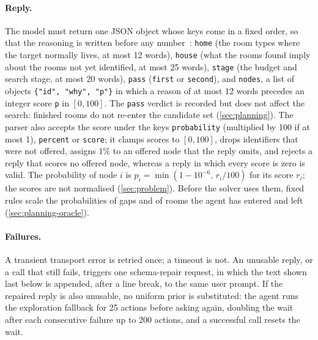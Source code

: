 \documentclass[10pt]{article}
\begin{document}
\paragraph{Reply.} The model must return one JSON object whose keys come in a fixed order, so that the reasoning is written before any number~\citep{wei2022chain}: \texttt{home} (the room types where the target normally lives, at most 12 words), \texttt{house} (what the rooms found imply about the rooms not yet identified, at most 25 words), \texttt{stage} (the budget and search stage, at most 20 words), \texttt{pass} (\texttt{first} or \texttt{second}), and \texttt{nodes}, a list of objects \texttt{\{"id", "why", "p"\}} in which a reason of at most 12 words precedes an integer score \texttt{p} in $[0,100]$. The \texttt{pass} verdict is recorded but does not affect the search: finished rooms do not re-enter the candidate set (\cref{sec:planning}).
The parser also accepts the score under the keys \texttt{probability} (multiplied by 100 if at most 1), \texttt{percent} or \texttt{score}; it clamps scores to $[0,100]$, drops identifiers that were not offered, assigns 1\% to an offered node that the reply omits, and rejects a reply that scores no offered node, whereas a reply in which every score is zero is valid. The probability of node $i$ is $p_i = \min(1-10^{-6},\, r_i/100)$ for its score $r_i$; the scores are not normalised (\cref{sec:problem}). Before the solver uses them, fixed rules scale the probabilities of gaps and of rooms the agent has entered and left (\cref{sec:planning-oracle}).

\paragraph{Failures.} A transient transport error is retried once; a timeout is not. An unusable reply, or a call that still fails, triggers one schema-repair request, in which the text shown last below is appended, after a line break, to the same user prompt. If the repaired reply is also unusable, no uniform prior is substituted: the agent runs the exploration fallback for 25 actions before asking again, doubling the wait after each consecutive failure up to 200 actions, and a successful call resets the wait.
\end{document}
